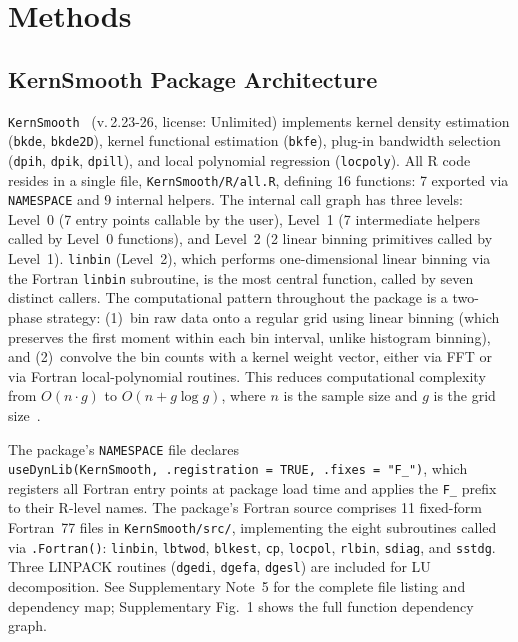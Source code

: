 \documentclass[12pt,a4paper]{article}
\newcommand{\pkg}[1]{\texttt{#1}}
\newcommand{\suppnote}[1]{Supplementary Note~#1}
\newcommand{\suppfig}[1]{Supplementary Fig.~#1}
\begin{document}
\printbibliography

\section{Methods}

\subsection{KernSmooth Package Architecture}

\pkg{KernSmooth}~\cite{wandjones1995} (v.\,2.23-26, license: Unlimited) implements kernel density estimation (\texttt{bkde}, \texttt{bkde2D}), kernel functional estimation (\texttt{bkfe}), plug-in bandwidth selection (\texttt{dpih}, \texttt{dpik}, \texttt{dpill}), and local polynomial regression (\texttt{locpoly}). All R code resides in a single file, \texttt{KernSmooth/R/all.R}, defining 16 functions: 7 exported via \texttt{NAMESPACE} and 9 internal helpers. The internal call graph has three levels: Level~0 (7 entry points callable by the user), Level~1 (7 intermediate helpers called by Level~0 functions), and Level~2 (2 linear binning primitives called by Level~1). \texttt{linbin} (Level~2), which performs one-dimensional linear binning via the Fortran \texttt{linbin} subroutine, is the most central function, called by seven distinct callers. The computational pattern throughout the package is a two-phase strategy: (1)~bin raw data onto a regular grid using linear binning (which preserves the first moment within each bin interval, unlike histogram binning), and (2)~convolve the bin counts with a kernel weight vector, either via FFT or via Fortran local-polynomial routines. This reduces computational complexity from $O(n \cdot g)$ to $O(n + g \log g)$, where $n$ is the sample size and $g$ is the grid size~\cite{wand1994}.

The package's \texttt{NAMESPACE} file declares \texttt{useDynLib(KernSmooth,~.registration~=~TRUE,~.fixes~=~"F\_")}, which registers all Fortran entry points at package load time and applies the \texttt{F\_} prefix to their R-level names. The package's Fortran source comprises 11 fixed-form Fortran~77 files in \texttt{KernSmooth/src/}, implementing the eight subroutines called via \texttt{.Fortran()}: \texttt{linbin}, \texttt{lbtwod}, \texttt{blkest}, \texttt{cp}, \texttt{locpol}, \texttt{rlbin}, \texttt{sdiag}, and \texttt{sstdg}. Three LINPACK routines (\texttt{dgedi}, \texttt{dgefa}, \texttt{dgesl}) are included for LU decomposition. See \suppnote{5} for the complete file listing and dependency map; \suppfig{1} shows the full function dependency graph.
\end{document}
